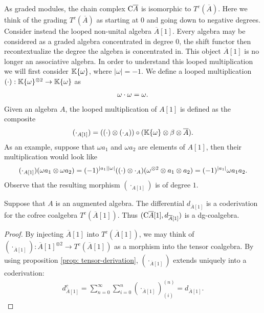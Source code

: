\documentclass[../thesis.tex]{subfiles}
\begin{document}
            As graded modules, the chain complex $\tt{C}\overline{A}$ is isomorphic to $T^c(\overline{A})$. Here we think of the grading $T^c(\overline{A})$ as starting at $0$ and going down to negative degrees. Consider instead the looped non-unital algebra $\overline{A}[1]$. Every algebra may be considered as a graded algebra concentrated in degree $0$, the shift functor then recontextualize the degree the algebra is concentrated in. This object $\overline{A}[1]$ is no longer an associative algebra. In order to understand this looped multiplication we will first consider $\mathbb{K}\startset{\omega}$, where $|\omega| = -1$. We define a looped multiplication $(\cdot):\mathbb{K}\startset{\omega}^{\otimes 2} \rightarrow \mathbb{K}\startset{\omega}$ as
            \begin{align*}
                \omega \cdot \omega = \omega\tt{.}
            \end{align*}
            Given an algebra $A$, the looped multiplication of $A[1]$ is defined as the composite 
            \begin{align*}
                (\cdot_{A[1]}) = ((\cdot) \otimes (\cdot_A)) \circ (\mathbb{K}\startset{\omega} \otimes \beta \otimes \overline{A})\tt{.} 
            \end{align*}
            As an example, suppose that $\omega a_1$ and $\omega a_2$ are elements of $A[1]$, then their multiplication would look like
            \begin{align*}
                (\cdot_{A[1]})(\omega a_1 \otimes \omega a_2) = (-1)^{|a_1||\omega|}((\cdot) \otimes \cdot_{A})(\omega^{\otimes 2} \otimes a_1 \otimes a_2) = (-1)^{|a_1|}\omega a_1 a_2\tt{.}
            \end{align*}
            Observe that the resulting morphism $(\cdot_{A[1]})$ is of degree $1$.

            \begin{proposition}\label{prop: a-to-dgc}
                Suppose that $A$ is an augmented algebra. The differential $d_{\overline{A}[1]}$ is a coderivation for the cofree coalgebra $T^c(\overline{A}[1])$. Thus $(\tt{C}\overline{A}[1], d_{\overline{A}[1]})$ is a dg-coalgebra.
            \end{proposition}

            \begin{proof}
                By injecting $\overline{A}[1]$ into $T^c(\overline{A}[1])$, we may think of $(\cdot_{\overline{A}[1]}) : \overline{A}[1]^{\otimes 2} \rightarrow T^c(\overline{A}[1])$ as a morphism into the tensor coalgebra. By using proposition \ref{prop: tensor-derivation}, $(\cdot_{\overline{A}[1]})$ extends uniquely into a coderivation:
                \begin{align*}
                    d_{\overline{A}[1]}^c = \sum_{n=0}^{\infty}\sum_{i=0}^n(\cdot_{\overline{A}[1]})_{(i)}^{(n)} = d_{\overline{A}[1]}\text{.}
                \end{align*}
            \end{proof}
\end{document}
